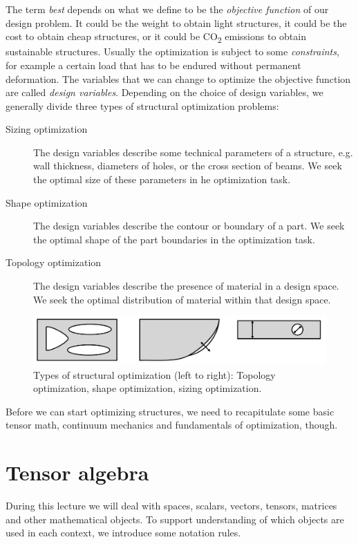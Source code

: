 The term \emph{best} depends on what we define to be the \emph{objective function} of our design problem. It could be the weight to obtain light structures, it could be the cost to obtain cheap structures, or it could be CO\textsubscript{2} emissions to obtain sustainable structures. Usually the optimization is subject to some \emph{constraints}, for example a certain load that has to be endured without permanent deformation. The variables that we can change to optimize the objective function are called \emph{design variables}. Depending on the choice of design variables, we generally divide three types of structural optimization problems: 
\begin{description}
    \item[Sizing optimization]{The design variables describe some technical parameters of a structure, e.g. wall thickness, diameters of holes, or the cross section of beams. We seek the optimal size of these parameters in he optimization task.}
    \item[Shape optimization]{The design variables describe the contour or boundary of a part. We seek the optimal shape of the part boundaries in the optimization task.}
    \item[Topology optimization]{The design variables describe the presence of material in a design space. We seek the optimal distribution of material within that design space.}
\end{description}

\begin{figure}[!htpb]
    \centering
    \includegraphics[width=\textwidth]{figures/structural_optimization_types.png}
    \caption{Types of structural optimization (left to right): Topology optimization, shape optimization, sizing optimization.}
    \label{fig:structural_optimization_types.}
\end{figure}

Before we can start optimizing structures, we need to recapitulate some basic tensor math, continuum mechanics and fundamentals of optimization, though. 

\section{Tensor algebra}
During this lecture we will deal with spaces, scalars, vectors, tensors, matrices and other mathematical objects. To support understanding of which objects are used in each context, we introduce some notation rules. 

